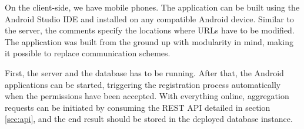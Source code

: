 On the client-side, we have mobile phones. The application can be built using the Android Studio IDE and installed on any compatible Android device. Similar to the server, the comments specify the locations where URLs have to be modified. The application was built from the ground up with modularity in mind, making it possible to replace communication schemes.

First, the server and the database has to be running. After that, the Android applications can be started, triggering the registration process automatically when the permissions have been accepted. With everything online, aggregation requests can be initiated by consuming the REST API detailed in section \ref{sec:api}, and the end result should be stored in the deployed database instance.